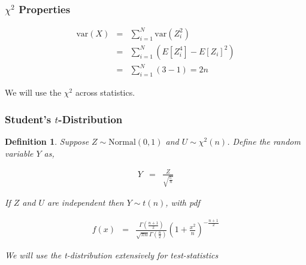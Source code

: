 \documentclass{beamer}
\newtheorem{defn}{Definition}
\numberwithin{equation}{section}
\begin{document}
\begin{frame}
\frametitle{$\chi^2$ Properties}

\begin{eqnarray}
\text{var}(X) & = & \sum_{i=1}^{N} \text{var}(Z_{i}^2) \nonumber \\
& = & \sum_{i=1}^{N} \left(E[Z_{i}^{4} ] - E[Z_{i}]^{2}  \right) \nonumber \\
& = & \sum_{i=1}^{N} \left(3 - 1\right ) = 2n \nonumber 
\end{eqnarray}

We will use the $\chi^2$ across statistics.  


\end{frame}


\begin{frame}
\frametitle{Student's $t$-Distribution}

\begin{defn}
Suppose $Z \sim \text{Normal}(0, 1)$ and $U \sim \chi^2(n)$.  Define the random variable $Y$ as, 

\begin{eqnarray}
Y & = & \frac{Z}{\sqrt{\frac{U}{n}}} \nonumber 
\end{eqnarray}

If $Z$ and $U$ are independent then $Y \sim t(n)$, with pdf 

\begin{eqnarray}
f(x) & = & \frac{\Gamma(\frac{n+1}{2})}{\sqrt{\pi n } \Gamma(\frac{n}{2})}\left(1 + \frac{x^2}{n}\right)^{-\frac{n+1}{2}} \nonumber 
\end{eqnarray}

We will use the t-distribution extensively for \alert{test-statistics}


\end{defn}



\end{frame}
\end{document}
